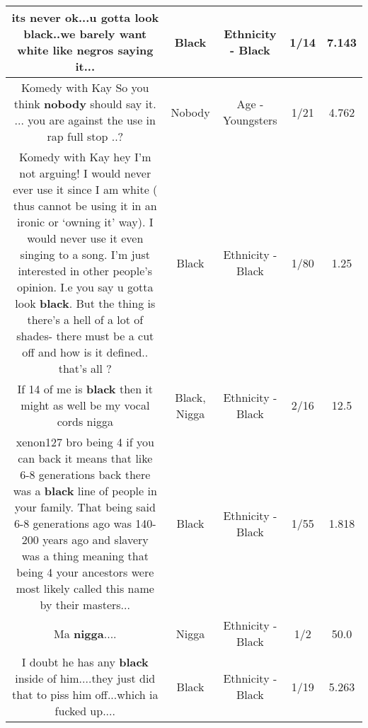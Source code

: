 \documentclass[11pt]{article}
\newlength\mylength
\begin{document}
\begin{center}
\begin{longtable}{|C{.65\mylength}|C{.30\mylength}|C{.12\mylength}|C{.12\mylength}|C{.12\mylength}|}
  \small {} its never ok...u gotta look \textbf{black}..we barely want white like negros saying it...\normalsize   & Black & Ethnicity - Black & 1/14 & 7.143 \\  \hline
  \small Komedy with Kay So you think \textbf{nobody} should say it. ... you are against the use in rap full stop ..?\normalsize   & Nobody & Age - Youngsters & 1/21 & 4.762 \\  \hline
  \small Komedy with Kay hey I'm not arguing! I would never ever use it since I am white ( thus cannot be using it in an ironic or ‘owning it' way). I would never use it even singing to a song. I'm just interested in other people's opinion. I.e you say u gotta look \textbf{black}. But the thing is there's a hell of a lot of shades- there must be a cut off and how is it defined.. that's all ?\normalsize   & Black & Ethnicity - Black & 1/80 & 1.25 \\  \hline
  \small If 14 of me is \textbf{black} then it might as well be my vocal cords nigga\normalsize   & Black, Nigga & Ethnicity - Black & 2/16 & 12.5 \\  \hline
  \small xenon127 bro being 4 if you can back it means that like 6-8 generations back there was a \textbf{black} line of people in your family. That being said 6-8 generations ago was 140-200 years ago and slavery was a thing meaning that being 4 your ancestors were most likely called this name by their masters...\normalsize   & Black & Ethnicity - Black & 1/55 & 1.818 \\  \hline
  \small Ma \textbf{nigga}....\normalsize   & Nigga & Ethnicity - Black & 1/2 & 50.0 \\  \hline
  \small I doubt he has any \textbf{black} inside of him....they just did that to piss him off...which ia fucked up....\normalsize   & Black & Ethnicity - Black & 1/19 & 5.263 \\  \hline

\end{longtable}
\end{center}
\end{document}
